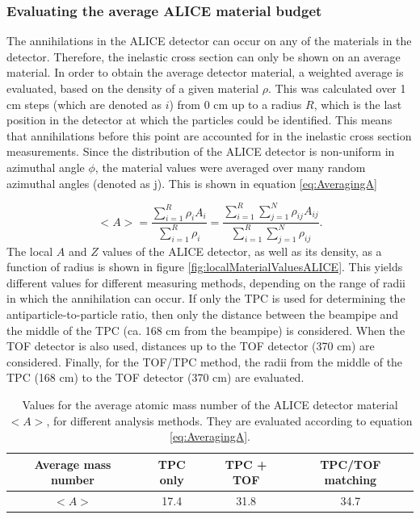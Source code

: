\subsubsection{Evaluating the average ALICE material budget}\label{sec:Meth:AveragingMaterial}
The annihilations in the ALICE detector can occur on any of the materials in the detector. Therefore, the inelastic cross section can only be shown on an average material. In order to obtain the average detector material, a weighted average is evaluated, based on the density of a given material $\rho$. This was calculated over 1 cm steps (which are denoted as $i$) from 0 cm up to a radius $R$, which is the last position in the detector at which the particles could be identified. This means that annihilations before this point are accounted for in the inelastic cross section measurements. Since the distribution of the ALICE detector is non-uniform in azimuthal angle $\phi$, the material values were averaged over many random azimuthal angles (denoted as j). This is shown in equation \ref{eq:AveragingA}


\begin{equation}\label{eq:AveragingA}
<A> = 
\frac{\sum_{i=1}^R \rho_iA_i}{\sum_{i=1}^R \rho_i} = 
\frac{\sum_{i=1}^R \sum_{j=1}^N \rho_{ij}A_{ij}}{\sum_{i=1}^R \sum_{j=1}^N \rho_{ij}}.
\end{equation}
The local $A$ and $Z$ values of the ALICE detector, as well as its density, as a function of radius is shown in figure \ref{fig:localMaterialValuesALICE}. This yields different values for different measuring methods, depending on the range of radii in which the annihilation can occur. If only the TPC is used for determining the antiparticle-to-particle ratio, then only the distance between the beampipe and the middle of the TPC (ca. 168 cm from the beampipe) is considered. When the TOF detector is also used, distances up to the TOF detector (370 cm) are considered. Finally, for the TOF/TPC method, the radii from the middle of the TPC (168 cm) to the TOF detector (370 cm) are evaluated. \\

\begin{table}[]
    \centering
    \begin{tabular}{|c|c|c|c|}
    \hline
          Average mass number  & TPC only & TPC + TOF & TPC/TOF matching \\ \hline 
        $<A>$ & 17.4 & 31.8 & 34.7\\ \hline 
    \end{tabular}
    \caption{Values for the average atomic mass number of the ALICE detector material $<A>$, for different analysis methods. They are evaluated according to equation \ref{eq:AveragingA}.}
    \label{tab:MeanALabels}
\end{table}


